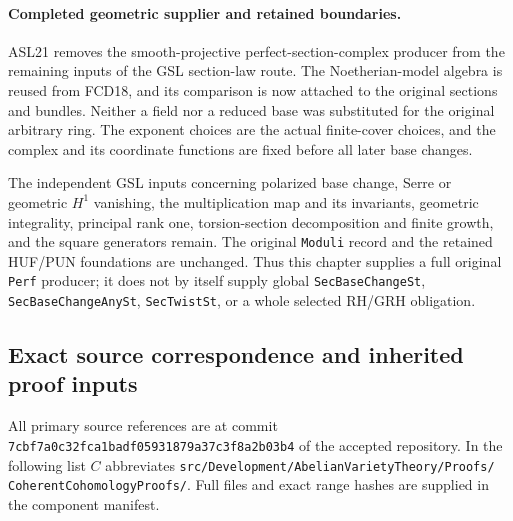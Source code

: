 \paragraph{Completed geometric supplier and retained boundaries.}
ASL21 removes the smooth-projective perfect-section-complex
producer from the remaining inputs of the GSL section-law route.
The Noetherian-model algebra is reused from FCD18, and its
comparison is now attached to the original sections and bundles.
Neither a field nor a reduced base was substituted for the
original arbitrary ring.  The exponent choices are the actual
finite-cover choices, and the complex and its coordinate functions
are fixed before all later base changes.

The independent GSL inputs concerning polarized base change,
Serre or geometric $H^1$ vanishing, the multiplication map and
its invariants, geometric integrality, principal rank one,
torsion-section decomposition and finite growth, and the square
generators remain.  The original \texttt{Moduli} record and
the retained HUF/PUN foundations are unchanged.  Thus this
chapter supplies a full original \texttt{Perf} producer;
it does not by itself supply global \texttt{Sec\allowbreak{}Base\allowbreak{}Change\allowbreak{}St},
\texttt{Sec\allowbreak{}Base\allowbreak{}Change\allowbreak{}Any\allowbreak{}St}, \texttt{Sec\allowbreak{}Twist\allowbreak{}St}, or a whole
selected RH/GRH obligation.

\subsection{Exact source correspondence and inherited proof inputs}

All primary source references are at commit
\texttt{7cbf7a0c32fca1badf05931879a37c3f8a2b03b4} of the
accepted repository.  In the following list $C$ abbreviates
\texttt{src/\allowbreak{}Development/\allowbreak{}Abelian\allowbreak{}Variety\allowbreak{}Theory/\allowbreak{}Proofs/\allowbreak{}}
\texttt{Coherent\allowbreak{}Cohomology\allowbreak{}Proofs/\allowbreak{}}.  Full files and exact
range hashes are supplied in the component manifest.

